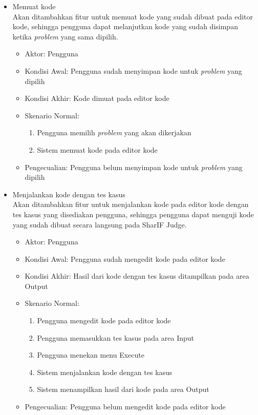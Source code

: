 \begin{itemize}
    \item Memuat kode \\ Akan ditambahkan fitur untuk memuat kode yang sudah dibuat pada editor kode, sehingga pengguna dapat melanjutkan kode yang sudah disimpan ketika \textit{problem} yang sama dipilih.
        \begin{itemize}
            \item Aktor: Pengguna
            \item Kondisi Awal: Pengguna sudah menyimpan kode untuk \textit{problem} yang dipilih
            \item Kondisi Akhir: Kode dimuat pada editor kode
            \item Skenario Normal:
                \begin{enumerate}
                    \item Pengguna memilih \textit{problem} yang akan dikerjakan
                    \item Sistem memuat kode pada editor kode
                \end{enumerate}
            \item Pengecualian: Pengguna belum menyimpan kode untuk \textit{problem} yang dipilih
        \end{itemize}
    
    
    \item Menjalankan kode dengan tes kasus \\  Akan ditambahkan fitur untuk menjalankan kode pada editor kode dengan tes kasus yang disediakan pengguna, sehingga pengguna dapat menguji kode yang sudah dibuat secara langsung pada SharIF Judge.
        \begin{itemize}
            \item Aktor: Pengguna
            \item Kondisi Awal: Pengguna sudah mengedit kode pada editor kode
            \item Kondisi Akhir: Hasil dari kode dengan tes kasus ditampilkan pada area Output
            \item Skenario Normal:
                \begin{enumerate}
                    \item Pengguna mengedit kode pada editor kode
                    \item Pengguna memasukkan tes kasus pada area Input
                    \item Pengguna menekan menu Execute
                    \item Sistem menjalankan kode dengan tes kasus
                    \item Sistem menampilkan hasil dari kode pada area Output
                \end{enumerate}
            \item Pengecualian:  Pengguna belum mengedit kode pada editor kode
        \end{itemize}
    

\end{itemize}
